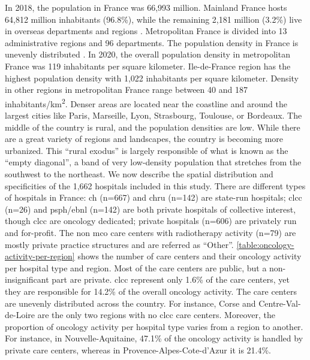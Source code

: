 In 2018, the population in France was 66,993 million. Mainland France hosts
64,812 million inhabitants (96.8\%), while the remaining 2,181 million (3.2\%)
live in overseas departments and regions . Metropolitan France is divided into
13 administrative regions and 96 departments. The population density in France
is unevenly distributed . In 2020, the overall population density in
metropolitan France was 119 inhabitants per square kilometer. Ile-de-France
region has the highest population density with 1,022 inhabitants per square
kilometer. Density in other regions in metropolitan France range between 40 and
187 inhabitants/km\textsuperscript{2}. Denser areas are located near the
coastline and around the largest cities like Paris, Marseille, Lyon, Strasbourg,
Toulouse, or Bordeaux. The middle of the country is rural, and the population
densities are low. While there are a great variety of regions and landscapes,
the country is becoming more urbanized. This ``rural exodus'' is largely
responsible of what is known as the ``empty diagonal'', a band of very
low-density population that stretches from the southwest to the northeast. We
now describe the spatial distribution and specificities of the 1,662 hospitals
included in this study. There are different types of hospitals in France:
\ac{ch}  (n=667) and \ac{chru}  (n=142) are state-run hospitals; \ac{clcc}
(n=26) and \ac{psph}/\ac{ebnl}  (n=142) are both private hospitals of collective
interest, though \ac{clcc} are oncology dedicated; private hospitals (n=606) are
privately run and for-profit. The non \ac{mco} care centers with radiotherapy
activity (n=79) are mostly private practice structures and are referred as
“Other”. \cref{table:oncology-activity-per-region} shows the number of care
centers and their oncology activity per hospital type and region. Most of the
care centers are public, but a non-insignificant part are private. \ac{clcc}
represent only 1.6\% of the care centers, yet they are responsible for 14.2\% of
the overall oncology activity. The care centers are unevenly distributed across
the country. For instance, Corse and Centre-Val-de-Loire are the only two
regions with no \ac{clcc} care centers. Moreover, the proportion of oncology
activity per hospital type varies from a region to another. For instance, in
Nouvelle-Aquitaine, 47.1\% of the oncology activity is handled by private care
centers, whereas in Provence-Alpes-Cote-d'Azur it is 21.4\%.

